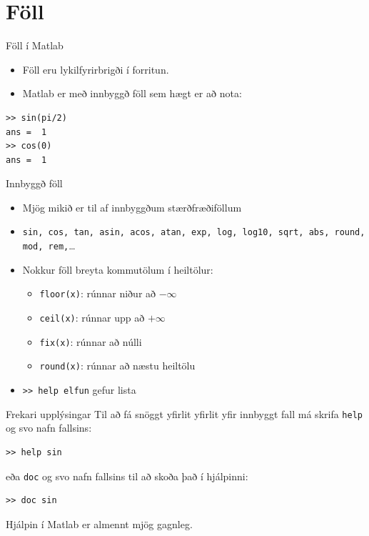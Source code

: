 \documentclass[handout]{beamer}
\begin{document}
\section{Föll}

\begin{frame}[fragile]{Föll í Matlab}
\begin{itemize}
 \item Föll eru lykilfyrirbrigði í forritun.
 \item Matlab er með innbyggð föll sem hægt er að nota:
\end{itemize}
\begin{verbatim}
>> sin(pi/2)
ans =  1
>> cos(0)
ans =  1
\end{verbatim}
\end{frame}

\begin{frame}{Innbyggð föll}
\begin{itemize}
 \item Mjög mikið er til af innbyggðum stærðfræðiföllum
 \item \texttt{sin, cos, tan, asin, acos, atan, exp, log, log10, sqrt, abs, round, mod, rem,}\ldots
 \item Nokkur föll breyta kommutölum í heiltölur:
 \begin{itemize}
  \item \texttt{floor(x)}: rúnnar niður að $-\infty$
  \item \texttt{ceil(x)}: rúnnar upp að $+\infty$
  \item \texttt{fix(x)}: rúnnar að núlli
  \item \texttt{round(x)}: rúnnar að næstu heiltölu
 \end{itemize}
 \item \texttt{>> help elfun} gefur lista
\end{itemize}
\end{frame}

\begin{frame}[fragile]{Frekari upplýsingar}
Til að fá snöggt yfirlit yfirlit yfir innbyggt fall má skrifa \texttt{help} og svo nafn fallsins:
\begin{verbatim}
>> help sin
\end{verbatim}
eða \texttt{doc} og svo nafn fallsins til að skoða það í hjálpinni:
\begin{verbatim}
>> doc sin
\end{verbatim}
Hjálpin í Matlab er almennt mjög gagnleg.
\end{frame}
\end{document}
